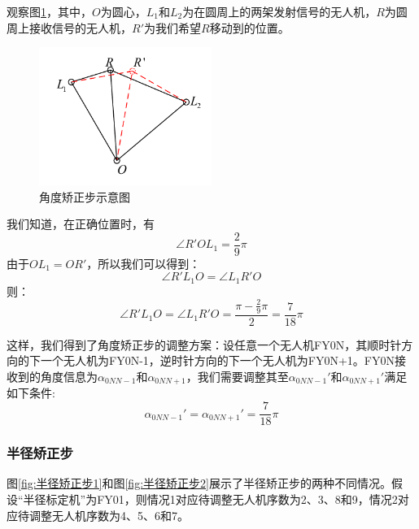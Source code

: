 \documentclass[12pt,AutoFakeSlant,AutoFakeBold]{article}
\begin{document}
观察图\ref{fig:角度矫正步}，其中，$O$为圆心，$L_1$和$L_2$为在圆周上的两架发射信号的无人机，$R$为圆周上接收信号的无人机，$R'$为我们希望$R$移动到的位置。

\begin{figure}[!ht]
    \centering
    \includegraphics[width=0.5\textwidth]{图片/角度矫正步.pdf}
    \caption{角度矫正步示意图}
    \label{fig:角度矫正步}
\end{figure}

我们知道，在正确位置时，有
\begin{equation}
    \angle R'OL_1 = \frac{2}{9}\pi
\end{equation}
由于$OL_1=OR'$，所以我们可以得到：
\begin{equation}
    \angle R'L_1O = \angle L_1R'O
\end{equation}
则：
\begin{equation}
    \angle R'L_1O = \angle L_1R'O = \frac{\pi - \frac{2}{9}\pi}{2} = \frac{7}{18}\pi
\end{equation}

这样，我们得到了角度矫正步的调整方案：设任意一个无人机FY0N，其顺时针方向的下一个无人机为FY0N-1，逆时针方向的下一个无人机为FY0N+1。FY0N接收到的角度信息为$\alpha_{0NN-1}$和$\alpha_{0NN+1}$，我们需要调整其至$\alpha_{0NN-1}'$和$\alpha_{0NN+1}'$满足如下条件:
\begin{equation}
    \alpha_{0NN-1}' = \alpha_{0NN+1}' = \frac{7}{18}\pi
    \label{eq:角度矫正步}
\end{equation}

\subsubsection{半径矫正步}

图\ref{fig:半径矫正步1}和图\ref{fig:半径矫正步2}展示了半径矫正步的两种不同情况。假设“半径标定机”为FY01，则情况1对应待调整无人机序数为2、3、8和9，情况2对应待调整无人机序数为4、5、6和7。
\end{document}
